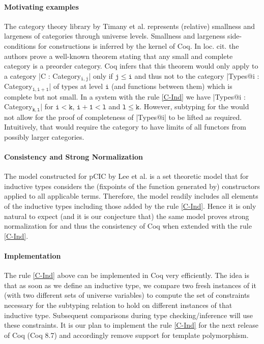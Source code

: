\documentclass{easychair}
\begin{document}
\paragraph{Motivating examples}
The category theory library by Timany et
al. \cite{DBLP:conf/rta/Timany016} represents (relative) smallness and
largeness of categories through universe levels. Smallness and largeness
side-conditions for constructions is inferred by the kernel of Coq. In
loc. cit. the authors prove a well-known theorem stating that any small
and complete category is a preorder category. Coq infers that this
theorem would only apply to a category \Coqe|C :
Category$_{\mathtt{i, j}}$| only if $\mathtt{j \le i}$ and thus not to
the category \Coqe|Types@{i} : Category$_{\mathtt{i, i + 1}}$| of types
at level $\mathtt{i}$ (and functions between them) which is complete but
not small.  In a system with the rule \ref{C-Ind} we have
\Coqe|Types@{i} : Category$_{\mathtt{k, l}}$| for $\mathtt{i < k}$,
$\mathtt{i + 1 < l}$ and $\mathtt{l \le k}$. However, subtyping for the
would not allow for the proof of completeness of \Coqe|Types@{i}| to be
lifted as required. Intuitively, that would require the category to have
limits of all functors from possibly larger categories.

\paragraph{Consistency and Strong Normalization}
The model constructed for pCIC by Lee et
al. \cite{DBLP:journals/corr/abs-1111-0123} is a set theoretic model
that for inductive types considers the (fixpoints of the function
generated by) constructors applied to all applicable terms. Therefore,
the model readily includes all elements of the inductive types
including those added by the rule \ref{C-Ind}. Hence it is only
natural to expect (and it is our conjecture that) the same model
proves strong normalization for and thus the consistency of Coq when
extended with the rule \ref{C-Ind}.


\paragraph{Implementation}
The rule \ref{C-Ind} above can be implemented in Coq very efficiently.
The idea is that as soon as we define an inductive type, we compare
two fresh instances of it (with two different sets of universe
variables) to compute the set of constraints necessary for the subtyping
relation to hold on different instances of that inductive type. Subsequent
comparisons during type checking/inference will use these constraints.
It is our plan to implement the rule \ref{C-Ind} for the next release
of Coq (Coq 8.7) and accordingly remove support for template
polymorphism.

\setlength{\bibsep}{0pt} %
\renewcommand{\bibfont}{\small} %


\end{document}
